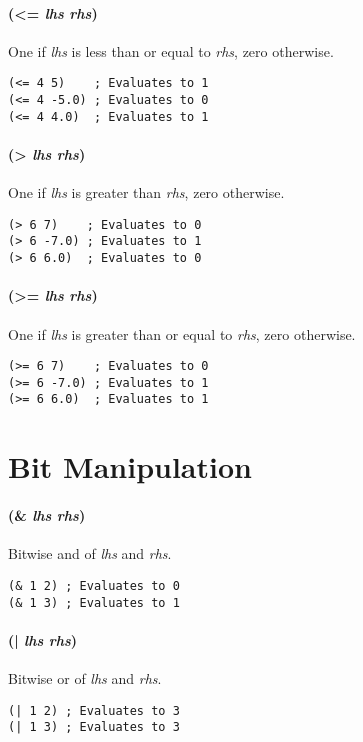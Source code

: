 \documentclass[twoside=false, numbers=noenddot]{scrbook}
\begin{document}
\paragraph{(<= \emph{lhs} \emph{rhs})}
One if \emph{lhs} is less than or equal to \emph{rhs}, zero otherwise.

\begin{verbatim}
(<= 4 5)    ; Evaluates to 1
(<= 4 -5.0) ; Evaluates to 0
(<= 4 4.0)  ; Evaluates to 1
\end{verbatim}

\paragraph{(> \emph{lhs} \emph{rhs})}
One if \emph{lhs} is greater than \emph{rhs}, zero otherwise.

\begin{verbatim}
(> 6 7)    ; Evaluates to 0
(> 6 -7.0) ; Evaluates to 1
(> 6 6.0)  ; Evaluates to 0
\end{verbatim}

\paragraph{(>= \emph{lhs} \emph{rhs})}
One if \emph{lhs} is greater than or equal to \emph{rhs}, zero otherwise.

\begin{verbatim}
(>= 6 7)    ; Evaluates to 0
(>= 6 -7.0) ; Evaluates to 1
(>= 6 6.0)  ; Evaluates to 1
\end{verbatim}

\section{Bit Manipulation}
\paragraph{(\& \emph{lhs} \emph{rhs})}
Bitwise and of \emph{lhs} and \emph{rhs}.

\begin{verbatim}
(& 1 2) ; Evaluates to 0
(& 1 3) ; Evaluates to 1
\end{verbatim}

\paragraph{(| \emph{lhs} \emph{rhs})}
Bitwise or of \emph{lhs} and \emph{rhs}.

\begin{verbatim}
(| 1 2) ; Evaluates to 3
(| 1 3) ; Evaluates to 3
\end{verbatim}
\end{document}
